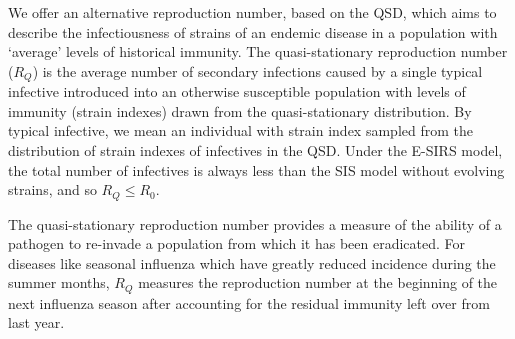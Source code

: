 \documentclass[review]{elsarticle}
\begin{document}
We offer an alternative reproduction number, based on the QSD, which aims to describe the infectiousness of strains of an endemic disease in a population with `average' levels of historical immunity. The quasi-stationary reproduction number ($R_Q$) is the average number of secondary infections caused by a single typical infective introduced into an otherwise susceptible population with levels of immunity (strain indexes) drawn from the quasi-stationary distribution. By typical infective, we mean an individual with strain index sampled from the distribution of strain indexes of infectives in the QSD. Under the E-SIRS model, the total number of infectives is always less than the SIS model without evolving strains, and so $R_Q\leq R_0$.

The quasi-stationary reproduction number provides a measure of the ability of a pathogen to re-invade a population from which it has been eradicated. For diseases like seasonal influenza which have greatly reduced incidence during the summer months, $R_Q$ measures the reproduction number at the beginning of the next influenza season after accounting for the residual immunity left over from last year.
\end{document}
